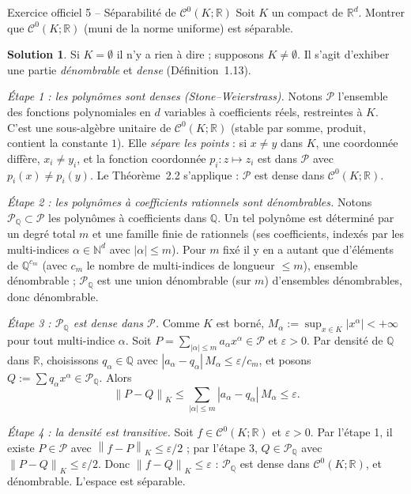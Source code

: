 \documentclass[11pt,a4paper]{article}
\newcommand{\R}{\mathbb{R}}
\newcommand{\N}{\mathbb{N}}
\newcommand{\Q}{\mathbb{Q}}
\newcommand{\norm}[1]{\left\|#1\right\|}
\newcommand{\Cz}{\mathcal{C}^0}
\theoremstyle{definition}
\newtheorem*{solution}{Solution}
\begin{document}
\begin{exo}{Exercice officiel 5 -- Séparabilité de $\Cz(K;\R)$}
Soit $K$ un compact de $\R^d$. Montrer que $\Cz(K;\R)$ (muni de la norme uniforme) est séparable.
\end{exo}

\begin{solution}
Si $K=\emptyset$ il n'y a rien à dire ; supposons $K\ne\emptyset$. Il s'agit d'exhiber une partie \emph{dénombrable} et \emph{dense} (Définition~1.13).

\emph{Étape 1 : les polynômes sont denses (Stone--Weierstrass).} Notons $\mathcal P$ l'ensemble des fonctions polynomiales en $d$ variables à coefficients réels, restreintes à $K$. C'est une sous-algèbre unitaire de $\Cz(K;\R)$ (stable par somme, produit, contient la constante $1$). Elle \emph{sépare les points} : si $x\ne y$ dans $K$, une coordonnée diffère, $x_i\ne y_i$, et la fonction coordonnée $p_i:z\mapsto z_i$ est dans $\mathcal P$ avec $p_i(x)\ne p_i(y)$. Le Théorème~2.2 s'applique : $\mathcal P$ est dense dans $\Cz(K;\R)$.

\emph{Étape 2 : les polynômes à coefficients rationnels sont dénombrables.} Notons $\mathcal P_\Q\subset\mathcal P$ les polynômes à coefficients dans $\Q$. Un tel polynôme est déterminé par un degré total $m$ et une famille finie de rationnels (ses coefficients, indexés par les multi-indices $\alpha\in\N^d$ avec $|\alpha|\le m$). Pour $m$ fixé il y en a autant que d'éléments de $\Q^{c_m}$ (avec $c_m$ le nombre de multi-indices de longueur $\le m$), ensemble dénombrable ; $\mathcal P_\Q$ est une union dénombrable (sur $m$) d'ensembles dénombrables, donc dénombrable.

\emph{Étape 3 : $\mathcal P_\Q$ est dense dans $\mathcal P$.} Comme $K$ est borné, $M_\alpha:=\sup_{x\in K}|x^\alpha|<+\infty$ pour tout multi-indice $\alpha$. Soit $P=\sum_{|\alpha|\le m}a_\alpha x^\alpha\in\mathcal P$ et $\varepsilon>0$. Par densité de $\Q$ dans $\R$, choisissons $q_\alpha\in\Q$ avec $|a_\alpha-q_\alpha|\,M_\alpha\le\varepsilon/c_m$, et posons $Q:=\sum q_\alpha x^\alpha\in\mathcal P_\Q$. Alors
\[
\norm{P-Q}_K\le\sum_{|\alpha|\le m}|a_\alpha-q_\alpha|\,M_\alpha\le\varepsilon .
\]

\emph{Étape 4 : la densité est transitive.} Soit $f\in\Cz(K;\R)$ et $\varepsilon>0$. Par l'étape 1, il existe $P\in\mathcal P$ avec $\norm{f-P}_K\le\varepsilon/2$ ; par l'étape 3, $Q\in\mathcal P_\Q$ avec $\norm{P-Q}_K\le\varepsilon/2$. Donc $\norm{f-Q}_K\le\varepsilon$ : $\mathcal P_\Q$ est dense dans $\Cz(K;\R)$, et dénombrable. L'espace est séparable.
\end{solution}
\end{document}

